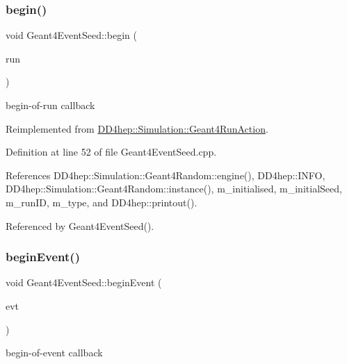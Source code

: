 \subsubsection{\texorpdfstring{begin()}{begin()}}
{\footnotesize\ttfamily void Geant4\+Event\+Seed\+::begin (\begin{DoxyParamCaption}\item[{const G4\+Run $\ast$}]{run }\end{DoxyParamCaption})\hspace{0.3cm}{\ttfamily [virtual]}}



begin-\/of-\/run callback 



Reimplemented from \hyperlink{class_d_d4hep_1_1_simulation_1_1_geant4_run_action_aeea4684e5d27e039b26734c3dbf3f65b}{D\+D4hep\+::\+Simulation\+::\+Geant4\+Run\+Action}.



Definition at line 52 of file Geant4\+Event\+Seed.\+cpp.



References D\+D4hep\+::\+Simulation\+::\+Geant4\+Random\+::engine(), D\+D4hep\+::\+I\+N\+FO, D\+D4hep\+::\+Simulation\+::\+Geant4\+Random\+::instance(), m\+\_\+initialised, m\+\_\+initial\+Seed, m\+\_\+run\+ID, m\+\_\+type, and D\+D4hep\+::printout().



Referenced by Geant4\+Event\+Seed().

\hypertarget{class_d_d4hep_1_1_simulation_1_1_geant4_event_seed_a3443a6ff92629d27474a97c1084d2867}{}\label{class_d_d4hep_1_1_simulation_1_1_geant4_event_seed_a3443a6ff92629d27474a97c1084d2867} 
\subsubsection{\texorpdfstring{begin\+Event()}{beginEvent()}}
{\footnotesize\ttfamily void Geant4\+Event\+Seed\+::begin\+Event (\begin{DoxyParamCaption}\item[{const G4\+Event $\ast$}]{evt }\end{DoxyParamCaption})}



begin-\/of-\/event callback 



